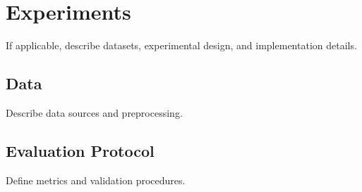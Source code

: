 \chapter{Experiments}

If applicable, describe datasets, experimental design, and implementation details.

\section{Data}
Describe data sources and preprocessing.

\section{Evaluation Protocol}
Define metrics and validation procedures.
